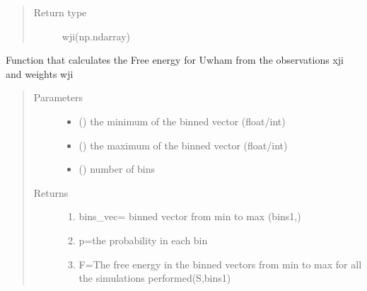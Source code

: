 \documentclass[letterpaper,10pt,english]{sphinxmanual}
\begin{document}
\begin{fulllineitems}
\begin{fulllineitems}
\begin{quote}
\begin{description}
\item[{Return type}] \leavevmode
wji(np.ndarray)

\end{description}\end{quote}

\end{fulllineitems}


\begin{fulllineitems}
\label{\detokenize{wham:wham.Uwham.Uwham.compute_betaF_profile}}
Function that calculates the Free energy for Uwham from the observations xji and
weights wji
\begin{quote}\begin{description}
\item[{Parameters}] \leavevmode\begin{itemize}
\item {} 
 () \textendash{} the minimum of the binned vector (float/int)

\item {} 
 () \textendash{} the maximum of the binned vector (float/int)

\item {} 
 () \textendash{} number of bins

\end{itemize}

\item[{Returns}] \leavevmode
\begin{enumerate}
%
\item {} 
bins\_vec= binned vector from min to max (bins\sphinxhyphen{}1,)

\item {} 
p=the probability in each bin

\item {} 
F=The free energy in the binned vectors from min to max for all the simulations performed(S,bins\sphinxhyphen{}1)


\end{enumerate}
\end{description}
\end{quote}
\end{fulllineitems}
\end{fulllineitems}
\end{document}

